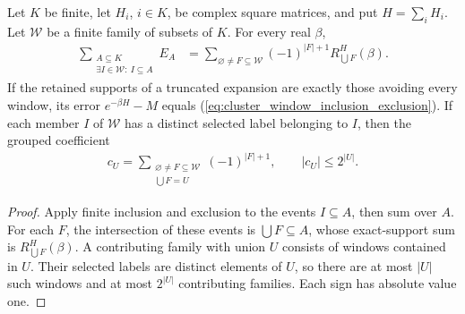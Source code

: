 \begin{lemma}
    \label{thm:cluster_window_inclusion_exclusion}
    \leanok

    Let $K$ be finite, let $H_i$, $i\in K$, be complex square matrices,
    and put $H=\sum_iH_i$. Let $\mathcal W$ be a finite family of subsets
    of $K$. For every real $\beta$,
    \begin{align}
        \sum_{\substack{A\subseteq K\\
              \exists I\in\mathcal W:\ I\subseteq A}}E_A
        &=\sum_{\varnothing\ne F\subseteq\mathcal W}
          (-1)^{|F|+1}R_{\bigcup F}^H(\beta).
        \label{eq:cluster_window_inclusion_exclusion}
    \end{align}
    If the retained supports of a truncated expansion are exactly those
    avoiding every window, its error $e^{-\beta H}-M$ equals
    (\ref{eq:cluster_window_inclusion_exclusion}).
    If each member $I$ of $\mathcal W$ has a distinct selected label
    belonging to $I$, then the grouped coefficient
    \begin{align}
        c_U=\sum_{\substack{\varnothing\ne F\subseteq\mathcal W\\
                           \bigcup F=U}}(-1)^{|F|+1}
        ,\qquad |c_U|\leq2^{|U|}.
        \label{eq:cluster_window_coefficient}
    \end{align}
\end{lemma}
\begin{proof}\leanok
    Apply finite inclusion and exclusion to the events $I\subseteq A$,
    then sum over $A$. For each $F$, the intersection of these events is
    $\bigcup F\subseteq A$, whose exact-support sum is
    $R_{\bigcup F}^H(\beta)$.
    A contributing family with union $U$ consists of windows contained in
    $U$. Their selected labels are distinct elements of $U$, so there
    are at most $|U|$ such windows and at most $2^{|U|}$ contributing
    families. Each sign has absolute value one.
\end{proof}

